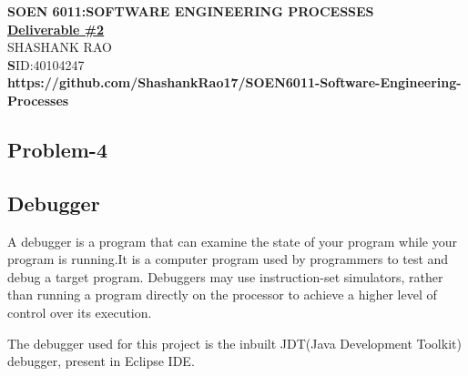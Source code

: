 \documentclass[12pt]{report}
\begin{document}
\begin{center}
	\large\textbf{SOEN 6011:SOFTWARE ENGINEERING PROCESSES}\\
	\vspace{0.05cm}\large\textbf{\underline{Deliverable \#2}}\\
	\vspace{0.05cm}\small{SHASHANK RAO}\\
	\small\textbf SID:40104247\\

	\vspace{0.10cm}\small\textbf{https://github.com/ShashankRao17/SOEN6011-Software-Engineering-Processes}
	
\end{center}

\renewcommand \thesection{\arabic{section}}
\renewcommand \thesubsection{\arabic{section}.\arabic{subsection}}

\begin{center}
\section{Problem-4}
\end{center}	

\subsection{Debugger}

A debugger is a program that can examine the state of your program while your program is running.It is a computer program used by programmers to test and debug a target program. Debuggers may use instruction-set simulators, rather than running a program directly on the processor to achieve a higher level of control over its execution.

The debugger used for this project is the inbuilt JDT(Java Development Toolkit) debugger, present in Eclipse IDE.
\end{document}
